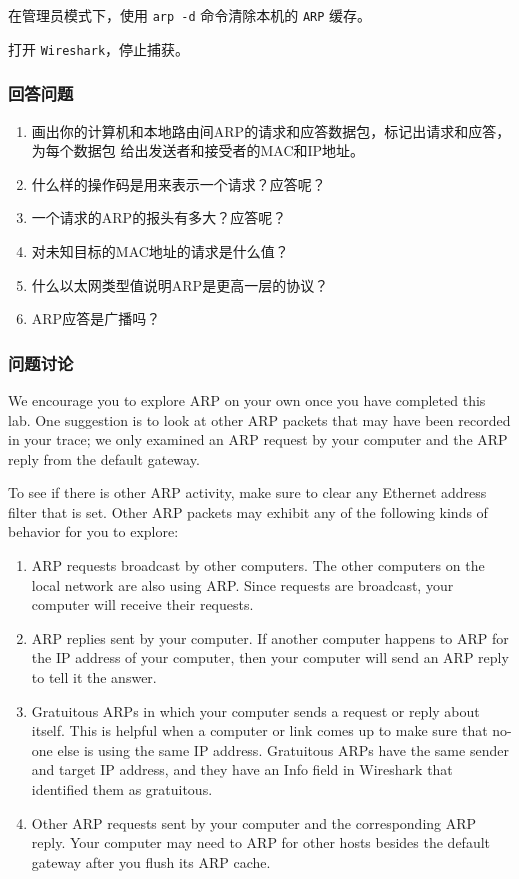 \documentclass{article}
\begin{document}
在管理员模式下，使用 \texttt{arp -d} 命令清除本机的 \texttt{ARP} 缓存。

打开 \texttt{Wireshark}，停止捕获。
\subsubsection{回答问题}

\begin{enumerate}[noitemsep]
  \item 画出你的计算机和本地路由间ARP的请求和应答数据包，标记出请求和应答，为每个数据包 给出发送者和接受者的MAC和IP地址。
  \item 什么样的操作码是用来表示一个请求？应答呢？
  \item 一个请求的ARP的报头有多大？应答呢？
  \item 对未知目标的MAC地址的请求是什么值？
  \item 什么以太网类型值说明ARP是更高一层的协议？
  \item ARP应答是广播吗？

\end{enumerate}


\subsubsection{问题讨论}

We encourage you to explore ARP on your own once you have completed this lab. One suggestion is to look at other ARP packets that may have been recorded in your trace; we only examined an ARP request by your computer and the ARP reply from the default gateway.

To see if there is other ARP activity, make sure to clear any Ethernet address filter that is set. Other ARP packets may exhibit any of the following kinds of behavior for you to explore:

\begin{enumerate}[noitemsep]
  \item ARP requests broadcast by other computers. The other computers on the local network are also using ARP. Since requests are broadcast, your computer will receive their requests.
  \item ARP replies sent by your computer. If another computer happens to ARP for the IP address of your computer, then your computer will send an ARP reply to tell it the answer.
  \item Gratuitous ARPs in which your computer sends a request or reply about itself. This is helpful when a computer or link comes up to make sure that no-one else is using the same IP address. Gratuitous ARPs have the same sender and target IP address, and they have an Info field in Wireshark that identified them as gratuitous.
  \item Other ARP requests sent by your computer and the corresponding ARP reply. Your computer may need to ARP for other hosts besides the default gateway after you flush its ARP cache.
\end{enumerate}
\end{document}
